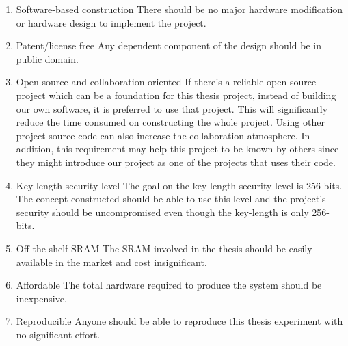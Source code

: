 \begin{enumerate}
    \item Software-based construction\newline
    There should be no major hardware modification or hardware design to implement the project.
    \item Patent/license free\newline
    Any dependent component of the design should be in public domain.
    \item Open-source and collaboration oriented\newline
    If there's a reliable open source project which can be a foundation for this thesis project, instead of building our own software, it is preferred to use that project. This will significantly reduce the time consumed on constructing the whole project. Using other project source code can also increase the collaboration atmosphere. In addition, this requirement may help this project to be known by others since they might introduce our project as one of the projects that uses their code.
    \item Key-length security level\newline
    The goal on the key-length security level is 256-bits. The concept constructed should be able to use this level and the project's security should be uncompromised even though the key-length is only 256-bits.
    \item Off-the-shelf SRAM\newline
    The SRAM involved in the thesis should be easily available in the market and cost insignificant.
    \item Affordable\newline
    The total hardware required to produce the system should be inexpensive.
    \item Reproducible\newline
    Anyone should be able to reproduce this thesis experiment with no significant effort.
\end{enumerate}


